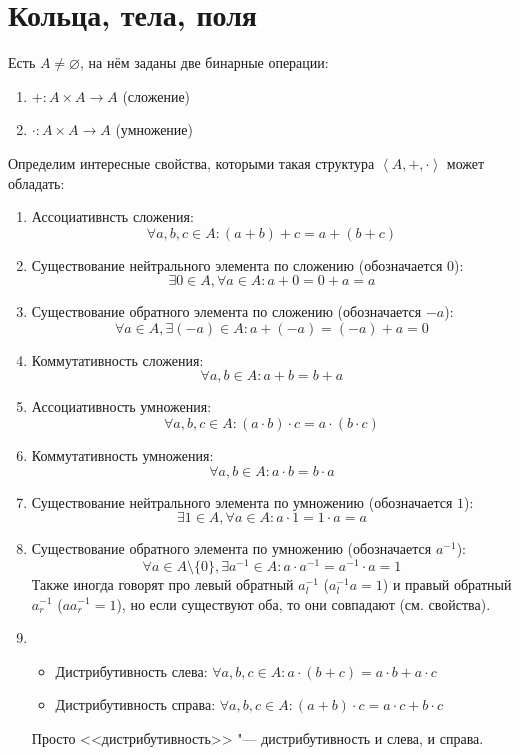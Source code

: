 \section{Кольца, тела, поля}
\begin{Def}
Есть $A \neq \varnothing$, на нём заданы две бинарные операции:
\begin{enumerate}
\item $+: A \times A \to A$ (сложение)
\item $\cdot: A \times A \to A$ (умножение)
\end{enumerate}

Определим интересные свойства, которыми такая структура $\left<A, +, \cdot\right>$ может обладать:

\begin{enumerate}
\item Ассоциативнсть сложения:
	\[ \forall a, b, c \in A \colon (a + b) + c = a + (b + c) \]
\item Существование нейтрального элемента по сложению (обозначается $0$):
	\[ \exists 0 \in A, \forall a \in A \colon a + 0 = 0 + a = a \]
\item Существование обратного элемента по сложению (обозначается $-a$):
	\[ \forall a \in A, \exists (-a) \in A \colon a + (-a) = (-a) + a = 0 \]
\item Коммутативность сложения:
	\[ \forall a, b \in A \colon a + b = b + a \]
\item Ассоциативность умножения:
	\[ \forall a, b, c \in A \colon (a \cdot b) \cdot c = a \cdot (b \cdot c) \]
\item Коммутативность умножения:
	\[ \forall a, b \in A \colon a \cdot b = b \cdot a \]
\item Существование нейтрального элемента по умножению (обозначается $1$):
	\[ \exists 1 \in A, \forall a \in A \colon a \cdot 1 = 1 \cdot a = a \]
\item Существование обратного элемента по умножению (обозначается $a^{-1}$):
 	\[ \forall a \in A \setminus \{0\}, \exists a^{-1} \in A \colon a \cdot a^{-1} = a^{-1} \cdot a = 1 \]
 	Также иногда говорят про левый обратный $a^{-1}_l$ ($a^{-1}_la = 1$) и правый обратный $a^{-1}_r$ ($aa^{-1}_r=1$),
 	но если существуют оба, то они совпадают (см. свойства).
\item
    \begin{itemize}
	\item Дистрибутивность слева: $ \forall a, b, c \in A \colon a \cdot (b + c) = a \cdot b + a \cdot c $\\
	\item Дистрибутивность справа: $ \forall a, b, c \in A \colon (a + b) \cdot c = a \cdot c + b \cdot c $\\
	\end{itemize}
	Просто <<дистрибутивность>> "--- дистрибутивность и слева, и справа.
\end{enumerate}
\end{Def}

